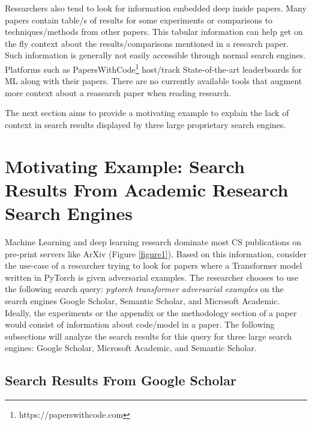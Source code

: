 Researchers also tend to look for information embedded deep inside papers. Many papers contain table/s of results for some experiments or comparisons to techniques/methods from other papers. This tabular information can help get on the fly context about the results/comparisons mentioned in a research paper. Such information is generally not easily accessible through normal search engines. Platforms such as PapersWithCode\footnote{https://paperswithcode.com} host/track State-of-the-art leaderboards for ML along with their papers. There are no currently available tools that augment more context about a reasearch paper when reading research. 


The next section aims to provide a motivating example to explain the lack of context in search results displayed by three large proprietary search engines.

\section{Motivating Example: Search Results From Academic Research Search Engines}
Machine Learning and deep learning research dominate most CS publications on pre-print servers like ArXiv (Figure \ref{figure1}).
Based on this information, consider the use-case of a researcher trying to look for papers where a Transformer\parencite{vaswani2017attention} model written in PyTorch\parencite{paszke2019pytorch} is given adversarial examples. 
The researcher chooses to use the following search query: \textit{pytorch transformer adversarial examples} on the search engines Google Scholar, Semantic Scholar, and Microsoft Academic. 
Ideally, the experiments or the appendix or the methodology section of a paper would consist of information about code/model in a paper. 
The following subsections will analyze the search results for this query for three large search engines: Google Scholar, Microsoft Academic, and Semantic Scholar. 
\pagebreak
\subsection{Search Results From Google Scholar}
\label{sr-g}

